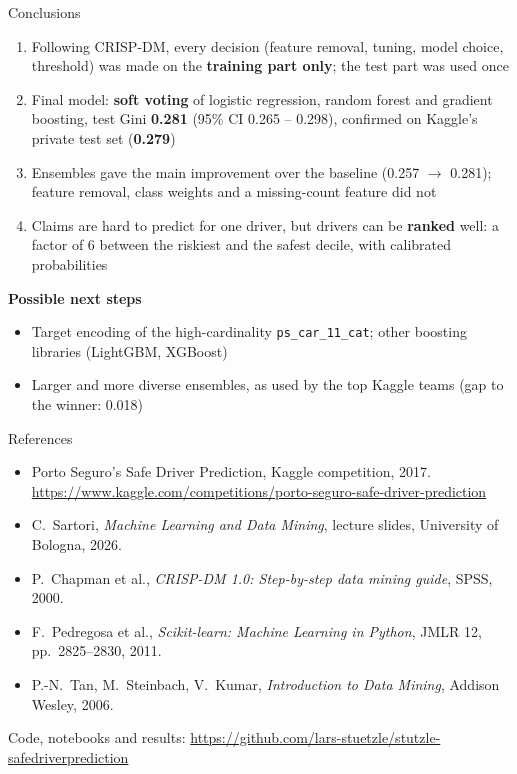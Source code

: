 \documentclass[aspectratio=169,11pt]{beamer}
\newcommand{\feat}[1]{\texttt{\small #1}}   %
\newcommand{\hl}[1]{\textcolor{accent}{\textbf{#1}}}
\begin{document}
\begin{frame}{Conclusions}
  \begin{enumerate}
    \item Following CRISP-DM, every decision (feature removal, tuning, model choice, threshold) was made on the
          \hl{training part only}; the test part was used once
    \item Final model: \hl{soft voting} of logistic regression, random forest and gradient boosting,
          test Gini \hl{0.281} (95\% CI 0.265 -- 0.298), confirmed on Kaggle's private test set (\hl{0.279})
    \item Ensembles gave the main improvement over the baseline (0.257 $\rightarrow$ 0.281); feature removal,
          class weights and a missing-count feature did not
    \item Claims are hard to predict for one driver, but drivers can be \hl{ranked} well: a factor of 6 between
          the riskiest and the safest decile, with calibrated probabilities
  \end{enumerate}
  \smallskip
  \textbf{Possible next steps}
  \small
  \begin{itemize}
    \item Target encoding of the high-cardinality \feat{ps\_car\_11\_cat}; other boosting libraries (LightGBM, XGBoost)
    \item Larger and more diverse ensembles, as used by the top Kaggle teams (gap to the winner: 0.018)
  \end{itemize}
\end{frame}

\appendix
\begin{frame}{References}
  \small
  \begin{itemize}
    \item Porto Seguro's Safe Driver Prediction, Kaggle competition, 2017.\\
          \url{https://www.kaggle.com/competitions/porto-seguro-safe-driver-prediction}
    \item C.\ Sartori, \emph{Machine Learning and Data Mining}, lecture slides, University of Bologna, 2026.
    \item P.\ Chapman et al., \emph{CRISP-DM 1.0: Step-by-step data mining guide}, SPSS, 2000.
    \item F.\ Pedregosa et al., \emph{Scikit-learn: Machine Learning in Python}, JMLR 12, pp.\ 2825--2830, 2011.
    \item P.-N.\ Tan, M.\ Steinbach, V.\ Kumar, \emph{Introduction to Data Mining}, Addison Wesley, 2006.
  \end{itemize}
  \vfill
  \centering
  Code, notebooks and results: \url{https://github.com/lars-stuetzle/stutzle-safedriverprediction}
\end{frame}
\end{document}
